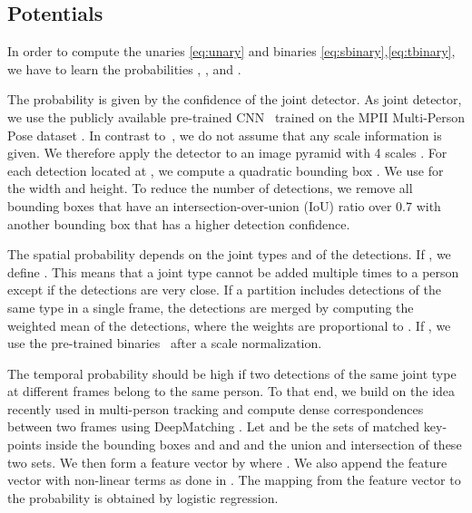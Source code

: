 \documentclass[10pt,twocolumn,letterpaper]{article}
\begin{document}
\vspace{-1mm}
\subsection{Potentials}
\label{sec:optimization_costs}
In order to compute the unaries  \eqref{eq:unary} and binaries  \eqref{eq:sbinary},\eqref{eq:tbinary}, we have to learn the probabilities , , and . 

The probability  is given by the confidence of the joint detector. As joint detector, we use the publicly available pre-trained CNN~\cite{insafutdinov2016deepercut} trained on the MPII Multi-Person Pose dataset \cite{pishchulin2016deepcut}. In contrast to~\cite{insafutdinov2016deepercut}, we do not assume that any scale information is given. We therefore apply the detector to an image pyramid with 4 scales . For each detection  located at , we compute a quadratic bounding box . We use  for the width and height. To reduce the number of detections, we remove all bounding boxes that have an intersection-over-union (IoU) ratio over 0.7 with another bounding box that has a higher detection confidence.   

The spatial probability  depends on the joint types  and  of the detections. If , we define \mbox{}. This means that a joint type  cannot be added multiple times to a person except if the detections are very close. If a partition includes detections of the same type in a single frame, the detections are merged by computing the weighted mean of the detections, where the weights are proportional to . If , we use the pre-trained binaries~\cite{insafutdinov2016deepercut} after a scale normalization.           

The temporal probability  should be high if two detections of the same joint type at different frames belong to the same person. To that end, we build on the idea recently used in multi-person tracking \cite{tang-2016} and compute dense correspondences between two frames using DeepMatching \cite{weinzaepfel:hal-00873592}. Let  and  be the sets of matched key-points inside the bounding boxes  and  and  and  the union and intersection of these two sets. We then form a feature vector by  where \mbox{}. We also append the feature vector with non-linear terms as done in \cite{tang-2016}. The mapping from the feature vector to the probability  is obtained by logistic regression. 


\newcommand{\squeezeCol}{\vspace{-0.1cm}}
\end{document}
